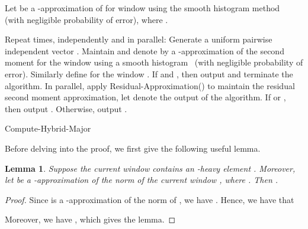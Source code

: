 \documentclass[11pt]{article}
\newtheorem{lem}{Lemma}
\begin{document}
\begin{algorithm}\label{alg:heavyapprox}
\DontPrintSemicolon
Let  be a -approximation of  for window  using the smooth histogram
method~\cite{BO07} (with negligible probability of error), where . \;

Repeat  times, independently and in parallel: \;
\Indp
Generate a uniform pairwise independent vector . \;
Maintain and denote by  a -approximation of the second moment for the window  using
a smooth histogram~\cite{BO07} (with negligible probability of error). \;
Similarly define  for the window . \;
If  and , then output  and terminate the algorithm. \;
\Indm
In parallel, apply Residual-Approximation() to maintain the residual second moment approximation,
let  denote the output of the algorithm. \;
If  or , then output . \;
Otherwise, output . \;
\caption{Compute-Hybrid-Major}
\end{algorithm}

Before delving into the proof, we first give the following useful lemma.

\begin{lem}\label{lem:heavyapprox}
Suppose the current window  contains an -heavy element .
Moreover, let  be a -approximation of the  norm of the current window , where .
Then .
\end{lem}
\begin{proof}
Since  is a -approximation of the  norm of , we have
.
Hence, we have that

Moreover, we have ,
which gives the lemma.
\end{proof}
\end{document}
